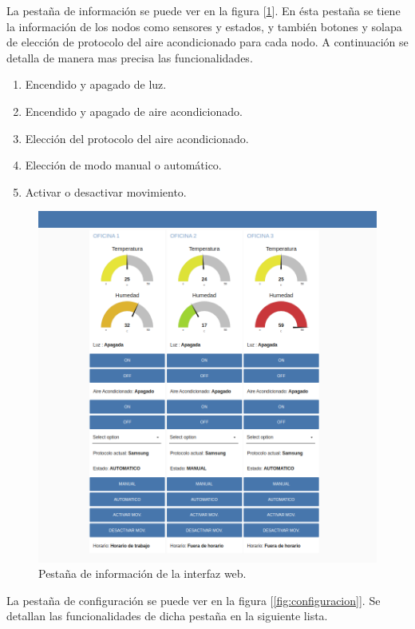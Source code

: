 La pestaña de información se puede ver en la figura [\ref{fig:informacion}]. En ésta pestaña se tiene la información de los nodos como sensores y estados, y también botones y solapa de elección de protocolo del aire acondicionado para cada nodo. A continuación se detalla de manera mas precisa las funcionalidades.

\begin{enumerate}
\item Encendido y apagado de luz.
\item Encendido y apagado de aire acondicionado.
\item Elección del protocolo del aire acondicionado.
\item Elección de modo manual o automático.
\item Activar o desactivar movimiento.
\end{enumerate}

\begin{figure}[h!]
	\centering
	\includegraphics[width=1\textwidth]{./Figures/informacion.png}
	\caption{Pestaña de información de la interfaz web.}
	\label{fig:informacion}
\end{figure}

La pestaña de configuración se puede ver en la figura [\ref{fig:configuracion}]. Se detallan las funcionalidades de dicha pestaña en la siguiente lista.

